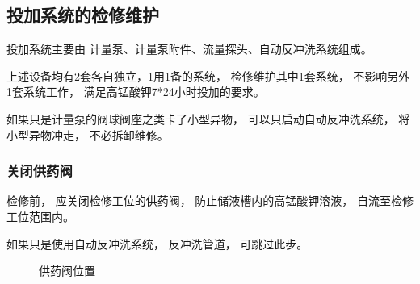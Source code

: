 \documentclass[UTF8,a4paper,12pt,titlepage]{ctexart}
\begin{document}
   \subsection{投加系统的检修维护}
        投加系统主要由
        计量泵、计量泵附件、流量探头、自动反冲洗系统组成。
        \par 上述设备均有2套各自独立，1用1备的系统，
        检修维护其中1套系统，
        不影响另外1套系统工作，
        满足高锰酸钾7*24小时投加的要求。
        \par 如果只是计量泵的阀球阀座之类卡了小型异物，
        可以只启动自动反冲洗系统，
        将小型异物冲走，
        不必拆卸维修。

        \subsubsection{关闭供药阀}
            检修前，
            应关闭检修工位的供药阀，
            防止储液槽内的高锰酸钾溶液，
            自流至检修工位范围内。
            \par 如果只是使用自动反冲洗系统，
            反冲洗管道，
            可跳过此步。

            \newpage
            
            \begin{figure}[h]
                \centering
                \caption{供药阀位置}
            \end{figure}
\end{document}
